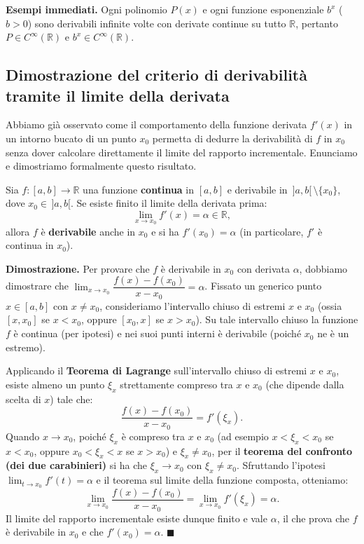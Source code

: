 \noindent\textbf{Esempi immediati.} Ogni polinomio $P(x)$ e ogni funzione esponenziale $b^x$ ($b > 0$) sono derivabili infinite volte con derivate continue su tutto $\mathbb{R}$, pertanto $P \in C^\infty(\mathbb{R})$ e $b^x \in C^\infty(\mathbb{R})$.

\subsection{Dimostrazione del criterio di derivabilità tramite il limite della derivata}

Abbiamo già osservato come il comportamento della funzione derivata $f'(x)$ in un intorno bucato di un punto $x_0$ permetta di dedurre la derivabilità di $f$ in $x_0$ senza dover calcolare direttamente il limite del rapporto incrementale. Enunciamo e dimostriamo formalmente questo risultato.

\begin{propbox}
Sia $f \colon [a,b] \to \mathbb{R}$ una funzione \textbf{continua} in $[a,b]$ e derivabile in $\,]a,b[\, \setminus \{x_0\}$, dove $x_0 \in \,]a,b[$.
Se esiste finito il limite della derivata prima:
\[
    \lim_{x \to x_0} f'(x) = \alpha \in \mathbb{R},
\]
allora $f$ è \textbf{derivabile} anche in $x_0$ e si ha $f'(x_0) = \alpha$ (in particolare, $f'$ è continua in $x_0$).
\end{propbox}

\noindent\textbf{Dimostrazione.} Per provare che $f$ è derivabile in $x_0$ con derivata $\alpha$, dobbiamo dimostrare che $\lim_{x \to x_0} \dfrac{f(x) - f(x_0)}{x - x_0} = \alpha$.
Fissato un generico punto $x \in [a,b]$ con $x \neq x_0$, consideriamo l'intervallo chiuso di estremi $x$ e $x_0$ (ossia $[x, x_0]$ se $x < x_0$, oppure $[x_0, x]$ se $x > x_0$). Su tale intervallo chiuso la funzione $f$ è continua (per ipotesi) e nei suoi punti interni è derivabile (poiché $x_0$ ne è un estremo).

Applicando il \textbf{Teorema di Lagrange} sull'intervallo chiuso di estremi $x$ e $x_0$, esiste almeno un punto $\xi_x$ strettamente compreso tra $x$ e $x_0$ (che dipende dalla scelta di $x$) tale che:
\[
    \frac{f(x) - f(x_0)}{x - x_0} = f'(\xi_x).
\]
Quando $x \to x_0$, poiché $\xi_x$ è compreso tra $x$ e $x_0$ (ad esempio $x < \xi_x < x_0$ se $x < x_0$, oppure $x_0 < \xi_x < x$ se $x > x_0$) e $\xi_x \neq x_0$, per il \textbf{teorema del confronto (dei due carabinieri)} si ha che $\xi_x \to x_0$ con $\xi_x \neq x_0$.
Sfruttando l'ipotesi $\lim_{t \to x_0} f'(t) = \alpha$ e il teorema sul limite della funzione composta, otteniamo:
\[
    \lim_{x \to x_0} \frac{f(x) - f(x_0)}{x - x_0} = \lim_{x \to x_0} f'(\xi_x) = \alpha.
\]
Il limite del rapporto incrementale esiste dunque finito e vale $\alpha$, il che prova che $f$ è derivabile in $x_0$ e che $f'(x_0) = \alpha$. $\blacksquare$

